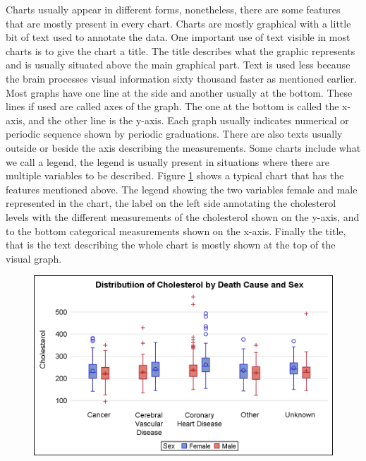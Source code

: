 \documentclass[12pt, a4paper,oneside]{report}
\begin{document}
Charts usually appear in different forms, nonetheless, there are some features that are mostly present in every chart. Charts are mostly graphical with a little bit of text used to annotate the data. One important use of text visible in most charts is to give the chart a title. The title describes what the graphic represents and is usually situated above the main graphical part. Text is used less because the brain processes visual information sixty thousand faster \cite{humaneye} as mentioned earlier. Most graphs have one line at the side and another usually at the bottom. These lines if used are called axes of the graph. The one at the bottom is called the x-axis, and the other line is the y-axis. Each graph usually indicates numerical or periodic sequence shown by periodic graduations. There are also texts usually outside or beside the axis describing the measurements.
Some charts include what we call a legend, the legend is usually present in situations where there are multiple variables to be described. Figure \ref{fig:boxy} shows a typical chart that has the features mentioned above. The legend showing the two variables female and male represented in the chart, the label on the left side annotating the cholesterol levels with the different measurements of the cholesterol shown on the y-axis, and to the bottom categorical measurements shown on the x-axis. Finally the title, that is the text describing the whole chart is mostly shown at the top of the visual graph. 

\begin{figure}[!htb]
	\centering
	\includegraphics [scale=1.0] {box_color.png}
	\label{fig:boxy}
\end{figure}
\end{document}
